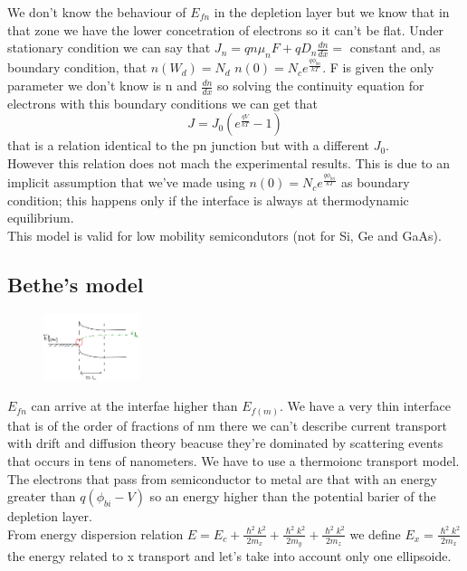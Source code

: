 We don't know the behaviour of $E_{fn}$ in the depletion layer but we know that in that zone we have the lower concetration of electrons so it can't be flat. Under stationary condition we can say that $ J_n=qn\mu_nF+qD_n \frac{dn}{dx}=$ constant and, as boundary condition, that $n(W_d)=N_d$ $n(0)=N_ce^{\frac{q\phi_{bn}}{kT}}$. F is given the only parameter we don't know is n and $\frac{dn}{dx}$ so solving the continuity equation for electrons with this boundary conditions we can get that
\begin{equation}
J=J_0(e^{\frac{qV}{kT}}-1)
\end{equation}
that is a relation identical to the pn junction but with a different $J_0$.\\
However this relation does not mach the experimental results. This is due to an implicit assumption that we've made using $n(0)=N_ce^{\frac{q\phi_{bn}}{kT}}$ as boundary condition; this happens only if the interface is always at thermodynamic equilibrium.\\
This model is valid for low mobility semicondutors (not for Si, Ge and GaAs).\\
\subsection{Bethe's model}
\begin{figure}
\includegraphics[width=0.25\textwidth]{msne.png}
\end{figure}

$E_{fn}$ can arrive at the interfae higher than $E_{f(m)}$. We have a very thin interface that is of the order of fractions of nm there we can't describe current transport with drift and diffusion theory beacuse they're dominated by scattering events that occurs in tens of nanometers. We have to use a thermoionc transport model.\\
The electrons that pass from semiconductor to metal are that with an energy greater than $q(\phi_{bi}-V)$ so an energy higher than the potential barier of the depletion layer.\\
From energy dispersion relation $E=E_c+\frac{\hslash^2k^2}{2m_x}+\frac{\hslash^2k^2}{2m_y}+\frac{\hslash^2k^2}{2m_z}$ we define $E_x=\frac{\hslash^2k^2}{2m_x}$ the energy related to x transport and let's take into account only one ellipsoide.\\

